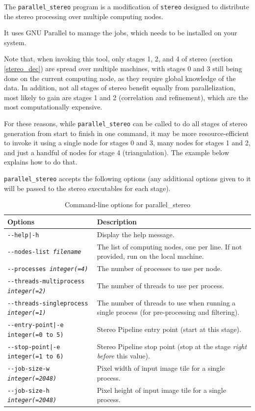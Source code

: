 The \texttt{parallel\_stereo} program is a modification of \texttt{stereo}
designed to distribute the stereo processing over multiple computing
nodes.

It uses GNU Parallel to manage the jobs, which needs to be installed
on your system.

Note that, when invoking this tool, only stages 1, 2, and 4 of
stereo (section \ref{stereo_dec}) are spread over multiple machines,
with stages 0 and 3 still being done on the current computing node, as
they require global knowledge of the data. In addition, not all stages
of stereo benefit equally from parallelization, most likely to gain
are stages 1 and 2 (correlation and refinement), which are the most
computationally expensive.

For these reasons, while \texttt{parallel\_stereo} can be called to do
all stages of stereo generation from start to finish in one command, it
may be more resource-efficient to invoke it using a single node for
stages 0 and 3, many nodes for stages 1 and 2, and just a handful of
nodes for stage 4 (triangulation). The example below explains how to do
that.

\texttt{parallel\_stereo} accepts the following options (any additional
options given to it will be passed to the stereo executables
for each stage).

\begin{longtable}{|l|p{7.5cm}|}
\caption{Command-line options for parallel\_stereo}
\label{tbl:parallelstereo}
\endfirsthead
\endhead
\endfoot
\endlastfoot
\hline
Options & Description \\ \hline \hline
\texttt{-\/-help|-h} & Display the help message.\\ \hline
\texttt{-\/-nodes-list \textit{filename} } & The list of computing nodes,
one per line. If not provided, run on the local machine. \\ \hline
\texttt{-\/-processes \textit{integer(=4)}} & The number of processes to
use per node. \\ \hline
\texttt{-\/-threads-multiprocess \textit{integer(=2)}} & The number of threads to use per process.\\ \hline
\texttt{-\/-threads-singleprocess \textit{integer(=1)}} & The number of threads to use when running a single process (for pre-processing and filtering).\\ \hline
\texttt{-\/-entry-point|-e integer(=0 to 5)} & Stereo Pipeline entry
point (start at this stage). \\ \hline
\texttt{-\/-stop-point|-e integer(=1 to 6)} & Stereo Pipeline stop point
(stop at the stage {\it right before} this value). \\ \hline
\texttt{-\/-job-size-w \textit{integer(=2048)}} & Pixel width of input
image tile for a single process. \\ \hline
\texttt{-\/-job-size-h \textit{integer(=2048)}} & Pixel height of input
image tile for a single process. \\ \hline
\end{longtable}

